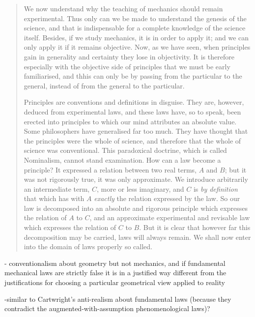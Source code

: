 \documentclass{article}
\begin{document}
 \begin{quote}
     We now understand why the teaching of mechanics should remain experimental.  Thus only can we be made to understand the genesis of the science, and that is indispensable for a complete knowledge of the science itself.  Besides, if we study mechanics, it is in order to apply it; and we can only apply it if it remains objective.  Now, as we have seen, when principles gain in generality and certainty they lose in objectivity.  It is therefore especially with the objective side of principles that we must be early familiarised, and thhis can only be by passing from the particular to the general, instead of from the general to the particular.
     
     Principles are conventions and definitions in disguise.  They are, however, deduced from experimental laws, and these laws have, so to speak, been erected into principles to which our mind attributes an absolute value.  Some philosophers have generalised far too much.  They have thought that the principles were the whole of science, and therefore that the whole of science was conventional.  This paradoxical doctrine, which is called Nominalism, cannot stand examination.  How can a law become a principle?  It expressed a relation between two real terms, $A$ and $B$; but it was not rigorously true, it was only approximate.  We introduce arbitrarily an intermediate term, $C$, more or less imaginary, and $C$ is \emph{by definition} that which has with $A$ \emph{exactly} the relation expressed by the law.  So our law is decomposed into an absolute and rigorous principle which expresses the relation of $A$ to $C$, and an approximate experimental and revisable law which expresses the relation of $C$ to $B$.  But it is clear that however far this decomposition may be carried, laws will always remain.  We shall now enter into the domain of laws properly so called.  \citep[p. 138-139]{Poincare1952}
 \end{quote}
 
 - conventionalism about geometry but not mechanics, and if fundamental mechanical laws are strictly false it is in a justified way different from the justifications for choosing a particular geometrical view applied to reality
 
 -similar to Cartwright's anti-realism about fundamental laws (because they contradict the augmented-with-assumption phenomenological laws)?
 
\end{document}
